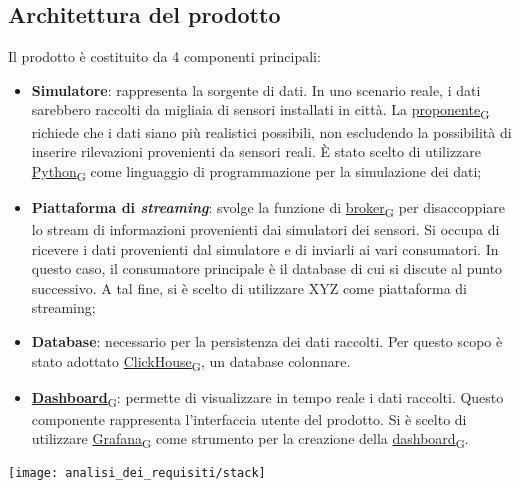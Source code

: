 \subsection{Architettura del prodotto}
Il prodotto è costituito da 4 componenti principali:
\begin{itemize}
	\item \textbf{Simulatore}: rappresenta la sorgente di dati. In uno scenario reale, i dati sarebbero raccolti da migliaia di sensori
	      installati in città. La \href{https://7last.github.io/docs/rtb/documentazione-interna/glossario\#proponente}{proponente\textsubscript{G}} richiede che i dati siano più realistici possibili, non escludendo la possibilità di inserire rilevazioni provenienti da sensori reali.
	      È stato scelto di utilizzare \href{https://7last.github.io/docs/rtb/documentazione-interna/glossario\#python}{Python\textsubscript{G}} come linguaggio di programmazione per la simulazione dei dati;
	\item \textbf{Piattaforma di \textit{streaming}}: svolge la funzione di \href{https://7last.github.io/docs/rtb/documentazione-interna/glossario\#broker}{broker\textsubscript{G}} per disaccoppiare lo stream di informazioni provenienti dai simulatori dei sensori.
	      Si occupa di ricevere i dati provenienti dal simulatore e di inviarli ai vari consumatori. In questo caso, il consumatore principale è il database
	      di cui si discute al punto successivo.
	      A tal fine, si è scelto di utilizzare XYZ come piattaforma di streaming; %
	\item \textbf{Database}: necessario per la persistenza dei dati raccolti. Per questo scopo è stato adottato \href{https://7last.github.io/docs/rtb/documentazione-interna/glossario\#clickhouse}{ClickHouse\textsubscript{G}}, un database colonnare.
	\item \href{https://7last.github.io/docs/rtb/documentazione-interna/glossario\#dashboard}{\textbf{Dashboard}\textsubscript{G}}: permette di visualizzare in tempo reale i dati raccolti. Questo componente rappresenta l'interfaccia utente del prodotto.
	      Si è scelto di utilizzare \href{https://7last.github.io/docs/rtb/documentazione-interna/glossario\#grafana}{Grafana\textsubscript{G}} come strumento per la creazione della \href{https://7last.github.io/docs/rtb/documentazione-interna/glossario\#dashboard}{dashboard\textsubscript{G}}.
\end{itemize}

\begin{center}
	\texttt{[image: analisi\_dei\_requisiti/stack]}
\end{center}

